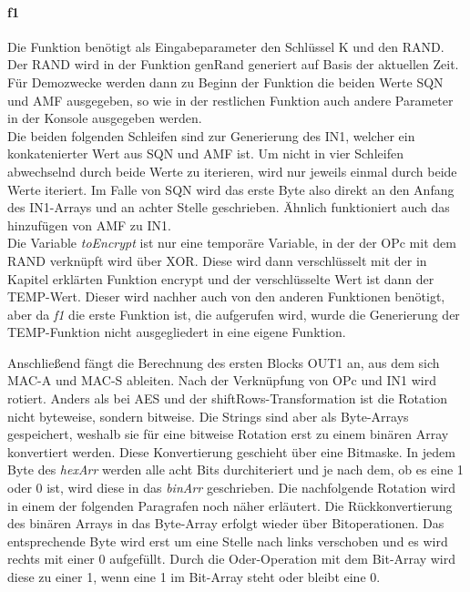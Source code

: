 		\paragraph{f1}
		Die Funktion benötigt als Eingabeparameter den Schlüssel K und den RAND. Der RAND wird in der
		Funktion genRand generiert auf Basis der aktuellen Zeit. \\
		Für Demozwecke werden dann zu Beginn der Funktion die beiden Werte SQN und AMF ausgegeben, so
		wie in der restlichen Funktion auch andere Parameter in der Konsole ausgegeben werden. \\
		Die beiden folgenden Schleifen sind zur Generierung des IN1, welcher ein konkatenierter Wert aus
		SQN und AMF ist. Um nicht in vier Schleifen abwechselnd durch beide Werte zu iterieren, wird nur
		jeweils einmal durch beide Werte iteriert. Im Falle von SQN wird das erste Byte also direkt an den
		Anfang des IN1-Arrays und an achter Stelle geschrieben. Ähnlich funktioniert auch das hinzufügen von
		AMF zu IN1. \\
		Die Variable \emph{toEncrypt} ist nur eine temporäre Variable, in der der OPc mit dem RAND verknüpft
		wird über XOR. Diese wird dann verschlüsselt mit der in Kapitel  erklärten
		Funktion encrypt und der verschlüsselte Wert ist dann der TEMP-Wert. Dieser wird nachher auch von den
		anderen Funktionen benötigt, aber da \emph{f1} die erste Funktion ist, die aufgerufen wird, wurde die
		Generierung der TEMP-Funktion nicht ausgegliedert in eine eigene Funktion.
		
		Anschließend fängt die Berechnung des ersten Blocks OUT1 an, aus dem sich MAC-A und MAC-S ableiten. Nach
		der Verknüpfung von OPc und IN1 wird rotiert. Anders als bei AES und der shiftRows-Transformation ist die
		Rotation nicht byteweise, sondern bitweise. Die Strings sind aber als Byte-Arrays gespeichert, weshalb sie
		für eine bitweise Rotation erst zu einem binären Array konvertiert werden. Diese Konvertierung geschieht
		über eine Bitmaske. In jedem Byte des \emph{hexArr} werden alle acht Bits durchiteriert und je nach dem, ob
		es eine 1 oder 0 ist, wird diese in das \emph{binArr} geschrieben. Die nachfolgende Rotation wird in einem
		der folgenden Paragrafen noch näher erläutert. Die Rückkonvertierung des binären Arrays in das
		Byte-Array erfolgt wieder über Bitoperationen. Das entsprechende Byte wird erst um eine Stelle nach links
		verschoben und es wird rechts mit einer 0 aufgefüllt. Durch die Oder-Operation mit dem Bit-Array wird diese
		zu einer 1, wenn eine 1 im Bit-Array steht oder bleibt eine 0.
		
